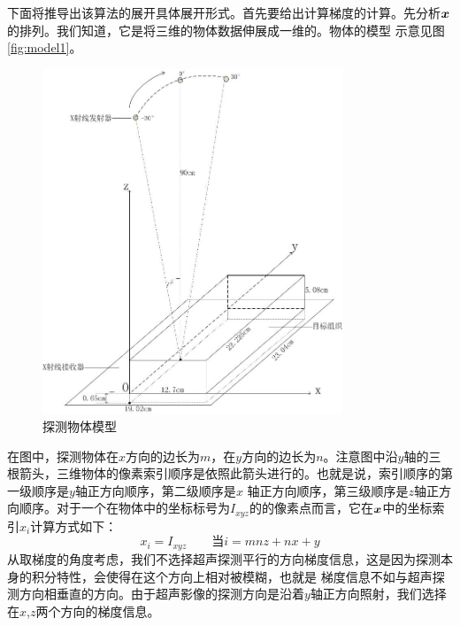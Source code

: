 下面将推导出该算法的展开具体展开形式。首先要给出计算梯度的计算。先分析$\bm{ x}$的排列。我们知道，它是将三维的物体数据伸展成一维的。物体的模型
示意见图\ref{fig:model1}。
\begin{figure}[ht]
\center
\includegraphics[width=0.8\textwidth]{figure/model1.jpg}
\caption{探测物体模型}\label{fig:modle1}
\end{figure}
在图中，探测物体在$x$方向的边长为$m$，在$y$方向的边长为$n$。注意图中沿$y$轴的三根箭头，三维物体的像素索引顺序是依照此箭头进行的。也就是说，索引顺序的第一级顺序是$y$轴正方向顺序，第二级顺序是$x$
轴正方向顺序，第三级顺序是$z$轴正方向顺序。对于一个在物体中的坐标标号为$I_{xyz}$的的像素点而言，它在$\bm{ x}$中的坐标索引$x_i$计算方式如下：
\begin{equation}\label{eq:indexconvert}
x_i = I_{xyz}\qquad \text{当} i = mnz+nx+y
\end{equation}
从取梯度的角度考虑，我们不选择超声探测平行的方向梯度信息，这是因为探测本身的积分特性，会使得在这个方向上相对被模糊，也就是
梯度信息不如与超声探测方向相垂直的方向。由于超声影像的探测方向是沿着$y$轴正方向照射，我们选择在$x$,$z$两个方向的梯度信息。

